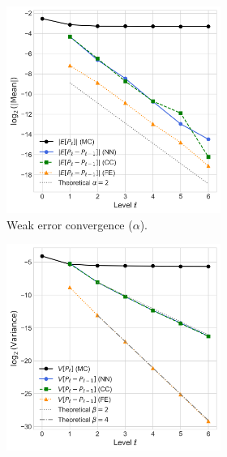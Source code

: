 \begin{figure}[htbp]
    \centering
    \begin{subfigure}{\textwidth}
        \centering
                \begin{subfigure}[b]{0.48\textwidth}
            \centering
            \includegraphics[width=\linewidth]{graphics/she_sq_amp_err_decay.png}
            \caption{Weak error convergence ($\alpha$).}
            \label{fig:she_sq_amp_mean_decay}
        \end{subfigure}
        \hfill
        \begin{subfigure}[b]{0.48\textwidth}
            \centering
            \includegraphics[width=\linewidth]{graphics/she_sq_amp_var_decay.png}

\end{subfigure}
\end{subfigure}
\end{figure}
